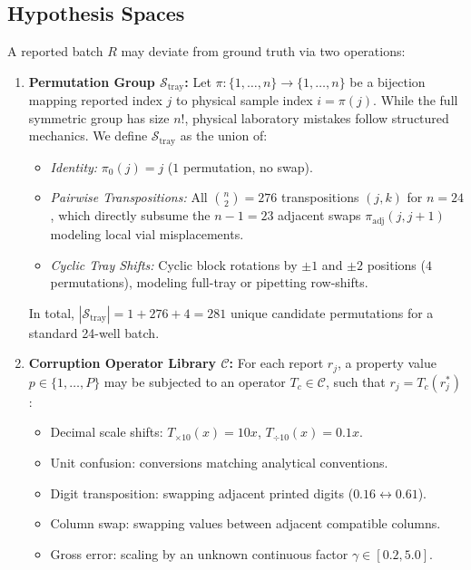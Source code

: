 \documentclass[journal,twoside]{IEEEtran}
\begin{document}
\subsection{Hypothesis Spaces}
A reported batch $R$ may deviate from ground truth via two operations:
\begin{enumerate}
    \item \textbf{Permutation Group $\mathcal{S}_{\text{tray}}$:} Let $\pi: \{1, \dots, n\} \to \{1, \dots, n\}$ be a bijection mapping reported index $j$ to physical sample index $i = \pi(j)$. While the full symmetric group has size $n!$, physical laboratory mistakes follow structured mechanics. We define $\mathcal{S}_{\text{tray}}$ as the union of:
    \begin{itemize}
        \item \emph{Identity:} $\pi_0(j) = j$ ($1$ permutation, no swap).
        \item \emph{Pairwise Transpositions:} All $\binom{n}{2} = 276$ transpositions $(j, k)$ for $n=24$, which directly subsume the $n-1 = 23$ adjacent swaps $\pi_{\text{adj}}(j, j+1)$ modeling local vial misplacements.
        \item \emph{Cyclic Tray Shifts:} Cyclic block rotations by $\pm 1$ and $\pm 2$ positions ($4$ permutations), modeling full-tray or pipetting row-shifts.
    \end{itemize}
    In total, $|\mathcal{S}_{\text{tray}}| = 1 + 276 + 4 = 281$ unique candidate permutations for a standard 24-well batch.
    \item \textbf{Corruption Operator Library $\mathcal{C}$:} For each report $r_j$, a property value $p \in \{1, \dots, P\}$ may be subjected to an operator $T_c \in \mathcal{C}$, such that $r_j = T_c(r_j^*)$:
    \begin{itemize}
        \item Decimal scale shifts: $T_{\times 10}(x) = 10x$, $T_{\div 10}(x) = 0.1x$.
        \item Unit confusion: conversions matching analytical conventions.
        \item Digit transposition: swapping adjacent printed digits ($0.16 \leftrightarrow 0.61$).
        \item Column swap: swapping values between adjacent compatible columns.
        \item Gross error: scaling by an unknown continuous factor $\gamma \in [0.2, 5.0]$.
    \end{itemize}
\end{enumerate}
\end{document}
